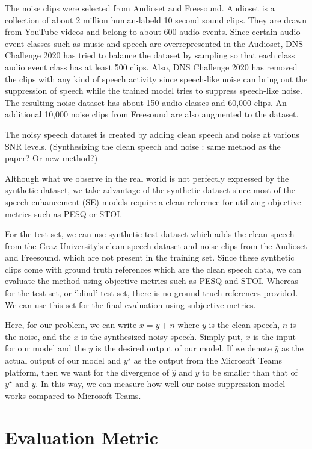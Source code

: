 \documentclass{article}
\begin{document}
The noise clips were selected from Audioset and Freesound. Audioset is a collection of about 2 million human-labeld 10 second sound clips. They are drawn from YouTube videos and belong to about 600 audio events. Since certain audio event classes such as music and speech are overrepresented in the Audioset, DNS Challenge 2020 has tried to balance the dataset by sampling so that each class audio event class has at least 500 clips. Also, DNS Challenge 2020 has removed the clips with any kind of speech activity since speech-like noise can bring out the suppression of speech while the trained model tries to suppress speech-like noise. The resulting noise dataset has about 150 audio classes and 60,000 clips. An additional 10,000 noise clips from Freesound are also augmented to the dataset.

The noisy speech dataset is created by adding clean speech and noise at various SNR levels. (Synthesizing the clean speech and noise : same method as the paper? Or new method?)

Although what we observe in the real world is not perfectly expressed by the synthetic dataset, we take advantage of the synthetic dataset since most of the speech enhancement (SE) models require a clean reference for utilizing objective metrics such as PESQ or STOI.

For the test set, we can use synthetic test dataset which adds the clean speech from the Graz University's clean speech dataset and noise clips from the Audioset and Freesound, which are not present in the training set. Since these synthetic clips come with ground truth references which are the clean speech data, we can evaluate the method using objective metrics such as PESQ and STOI. Whereas for the test set, or `blind' test set, there is no ground truch references provided. We can use this set for the final evaluation using subjective metrics.

Here, for our problem, we can write $x = y+n$ where $y$ is the clean speech, $n$ is the noise, and the $x$ is the synthesized noisy speech. Simply put, $x$ is the input for our model and the $y$ is the desired output of our model. If we denote $\hat y$ as the actual output of our model and $y^\star$ as the output from the Microsoft Teams platform, then we want for the divergence of $\hat y$ and $y$  to be smaller than that of $y^ \star$ and $y$. In this way, we can measure how well our noise suppression model works compared to Microsoft Teams.

\section{Evaluation Metric}
\end{document}
